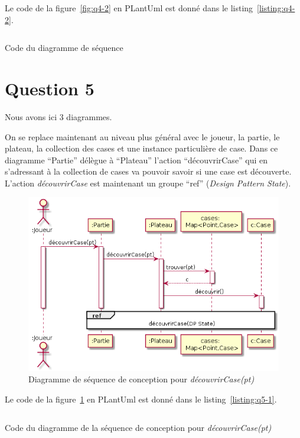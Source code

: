 \documentclass[a4paper,12pt]{article}
\begin{document}
Le code de la figure~\ref{fig:q4-2} en PLantUml est donné dans le listing~\ref{listing:q4-2}.

\begin{listing}[ht]
    \inputminted[bgcolor=lightgray!40,linenos=true]{fsharp}{./code-images/q4-2}
    \caption{Code du diagramme de séquence}
    \label{listing:q4-2}
\end{listing}

\clearpage

\section{Question 5}\label{question-5}

Nous avons ici 3 diagrammes.

On se replace maintenant au niveau plus général avec le joueur, la partie, le plateau, la  collection des cases et une instance particulière de case.
Dans ce diagramme ``Partie'' délègue à ``Plateau'' l'action ``découvrirCase'' qui en s'adressant à la collection de cases va pouvoir savoir si une case est découverte.
L'action \emph{découvrirCase} est maintenant un groupe ``ref'' (\emph{Design Pattern State}).

\begin{figure}[htpb]
    \centering
    \includegraphics[width=1\textwidth]{./images/q5-1.png}
    \caption{Diagramme de séquence de conception pour \emph{découvrirCase(pt)}}
    \label{fig:q5-1}
\end{figure}

Le code de la figure~\ref{fig:q5-1} en PLantUml est donné dans le listing~\ref{listing:q5-1}.

\begin{listing}[ht]
    \inputminted[bgcolor=lightgray!40,linenos=true]{fsharp}{./code-images/q5-1}
    \caption{Code du diagramme de la séquence de conception pour \emph{découvrirCase(pt)}}
    \label{listing:q5-1}
\end{listing}
\end{document}
